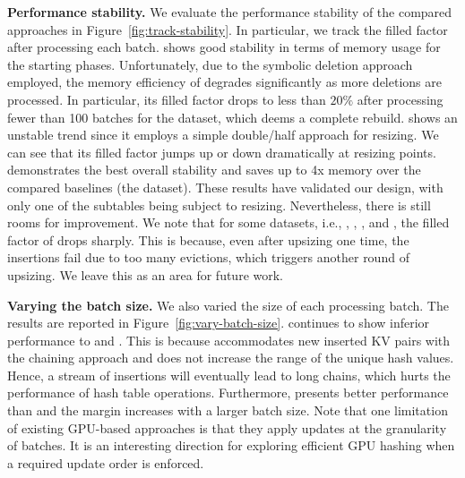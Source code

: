 \vspace{1mm}\noindent\textbf{Performance stability.}
We evaluate the performance stability of the compared approaches in Figure~\ref{fig:track-stability}. 
In particular, we track the filled factor after processing each batch.
\slab shows good stability in terms of memory usage for the starting phases. Unfortunately, due to the symbolic deletion approach employed, the memory efficiency of \slab degrades significantly as more deletions are processed. In particular, its filled factor drops to less than $20\%$ after processing fewer than 100 batches for the \dsali dataset, which deems a complete rebuild.
%
\megakv shows an unstable trend since it employs a simple double/half approach for resizing. We can see that its filled factor jumps up or down dramatically at resizing points. \voter demonstrates the best overall stability and saves up to 4x memory over the  compared baselines (the \dsali dataset). 
These results have validated our design, with only one of the subtables being subject to resizing. 
Nevertheless, there is still rooms for improvement. We note that for some datasets, i.e., \dstwitter, \dsreddit, \dstpch, and \dsrandom, the filled factor of \voter drops sharply.
This is because, even after upsizing one time, the insertions fail due to too many evictions, which triggers another round of upsizing. We leave this as an area for future work. 


\vspace{1mm}\noindent\textbf{Varying the batch size.}
We also varied the size of each processing batch. The results are reported in Figure~\ref{fig:vary-batch-size}. 
\slab continues to show inferior performance to \megakv and \voter. 
This is because \slab accommodates new inserted KV pairs with the chaining approach and does not increase the range of the unique hash values. Hence, a stream of insertions will eventually lead to long chains, which hurts the performance of hash table operations. Furthermore, \voter presents better performance than \megakv and the margin increases with a larger batch size.
Note that one limitation of existing GPU-based approaches is that they apply updates at the granularity of batches. It is an interesting direction for exploring efficient GPU hashing when a required update order is enforced.


